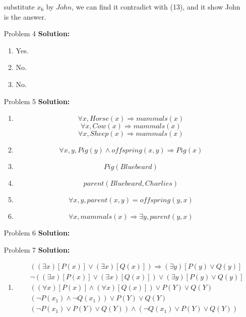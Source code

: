 \normalfont\documentclass[letterpaper,11pt]{article}
\begin{document}
\begin{enumerate}
	substitute $x_6$ by $John$, we can find it contradict with (13), and it show John is the answer.
\item[Problem 4]\textbf{Solution:}\par
	\begin{enumerate}
		\item Yes.
		\item No.
		\item No.
	\end{enumerate}
\item[Problem 5]\textbf{Solution:}\par
	\begin{enumerate}
		\item 
		$$\forall x, Horse(x) \Rightarrow mammals(x)$$
		$$\forall x, Cow(x) \Rightarrow mammals(x)$$
		$$\forall x, Sheep(x) \Rightarrow mammals(x)$$
		\item 
		$$\forall x,y, Pig(y) \land offspring(x,y) \Rightarrow Pig(x)$$
		\item 
		$$Pig(Bluebeard)$$
		\item
		$$parent(Bluebeard,Charlies)$$
		\item
		$$\forall x,y, parent(x,y) = offspring(y,x)$$
		\item
		$$\forall x,mammals(x) \Rightarrow \exists y, parent(y,x)$$
	\end{enumerate}	
\item[Problem 6]\textbf{Solution:}\par

\item[Problem 7]\textbf{Solution:}\par
\begin{enumerate}
	\item 
	\begin{eqnarray*}
		&&((\exists x)[P(x)] \lor (\exists x)[Q(x)])\Rightarrow (\exists y)[P(y) \lor Q(y)]\\
		&&\neg ((\exists x)[P(x)] \lor (\exists x)[Q(x)]) \lor (\exists y)[P(y) \lor Q(y)]\\
		&&((\forall x)[P(x)] \land (\forall x)[Q(x)]) \lor P(Y) \lor Q(Y)\\
		&&(\neg P(x_1)\land \neg Q(x_1)) \lor P(Y) \lor Q(Y)\\
		&&(\neg P(x_1)\lor P(Y) \lor Q(Y)) \land (\neg Q(x_1) \lor P(Y) \lor Q(Y))
	\end{eqnarray*}


\end{enumerate}
\end{enumerate}
\end{document}

